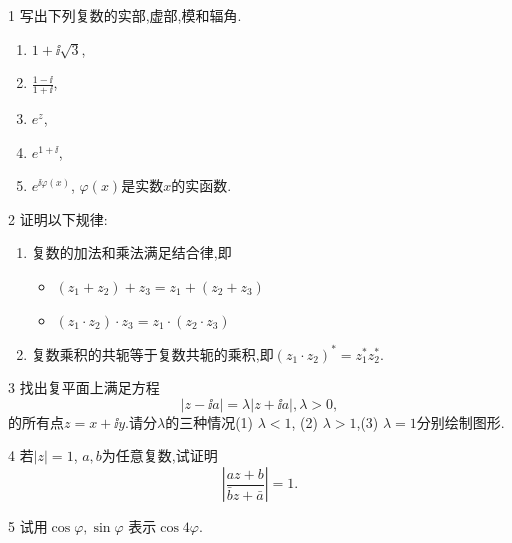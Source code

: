 \documentclass[11pt]{article}
\begin{document}
\begin{hwproblem}{1}
  写出下列复数的实部,虚部,模和辐角.
  \begin{enumerate}
    \item $1 + \ii \sqrt{3}$,
    \item $\frac{1-\ii}{1+\ii}$,
    \item $e^{z}$,
    \item $e^{1+\ii}$,
    \item $e^{\ii \varphi(x)}$, $\varphi(x)$是实数$x$的实函数.
  \end{enumerate}
\end{hwproblem}

\vspace{0.5cm}

\begin{hwproblem}{2}
  证明以下规律:
  \begin{enumerate}
    \item 复数的加法和乘法满足结合律,即 
    \begin{itemize}
      \item $(z_1 + z_2 ) + z_3 = z_1 +( z_2 + z_3)$
      \item $(z_1 \cdot z_2) \cdot z_3 = z_1 \cdot (z_2 \cdot z_3)$
    \end{itemize}

    \item 复数乘积的共轭等于复数共轭的乘积,即$(z_1 \cdot z_2)^* = z_1^* z_2^*$.
  \end{enumerate}  
\end{hwproblem}

\vspace{0.5cm}

\begin{hwproblem}{3}
  找出复平面上满足方程\[|z - \ii a|  = \lambda | z + \ii a|, \lambda > 0,\]
  的所有点$z = x + \ii y$.请分$\lambda$的三种情况(1) $\lambda<1$, (2) $\lambda >1$,(3) $\lambda = 1$分别绘制图形.
\end{hwproblem}

\vspace{0.5cm}

\begin{hwproblem}{4}
  若$|z|=1$, $a,b$为任意复数,试证明
  $$
  \left| \frac{a z + b}{\bar{b} z + \bar{a}} \right| = 1 .
  $$
\end{hwproblem}

\vspace{0.5cm}

\begin{hwproblem}{5}
  试用$\cos\varphi, \sin\varphi$ 表示$\cos 4\varphi$.
\end{hwproblem}
\end{document}
